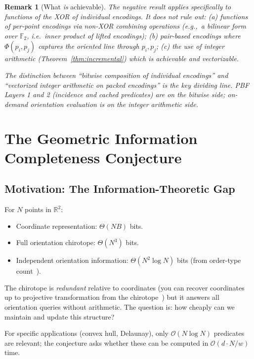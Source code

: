\documentclass[11pt,letterpaper]{article}
\newtheorem{remark}[theorem]{Remark}
\newcommand{\RR}{\mathbb{R}}
\newcommand{\cO}{\mathcal{O}}
\newcommand{\wt}{w}       %
\begin{document}
\begin{remark}[What \emph{is} achievable]
The negative result applies specifically to functions of the XOR of individual
encodings.  It does \emph{not} rule out:
(a) functions of per-point encodings via non-XOR combining operations (e.g.,\ a
bilinear form over $\mathbb{F}_2$, i.e.\ inner product of lifted encodings);
(b) pair-based encodings where $\Phi(p_i,p_j)$ captures the oriented line through $p_i,p_j$;
(c) the use of integer arithmetic (Theorem~\ref{thm:incremental}) which \emph{is}
achievable and vectorizable.

The distinction between ``bitwise composition of individual encodings'' and
``vectorized integer arithmetic on packed encodings'' is the key dividing line.
PBF Layers 1 and 2 (incidence and cached predicates) are on the bitwise side;
on-demand orientation evaluation is on the integer arithmetic side.
\end{remark}

\section{The Geometric Information Completeness Conjecture}\label{sec:conjecture}

\subsection{Motivation: The Information-Theoretic Gap}

For $N$ points in $\RR^2$:
\begin{itemize}[nosep]
\item Coordinate representation: $\Theta(NB)$ bits.
\item Full orientation chirotope: $\Theta(N^3)$ bits.
\item Independent orientation information: $\Theta(N^2\log N)$ bits (from order-type
  count~\cite{Aichholzer07}).
\end{itemize}

The chirotope is \emph{redundant} relative to coordinates (you can recover coordinates
up to projective transformation from the chirotope~\cite{Mnev88}) but it answers
all orientation queries without arithmetic.  The question is: how cheaply can we
maintain and update this structure?

For specific applications (convex hull, Delaunay), only $\cO(N\log N)$ predicates are
relevant; the conjecture asks whether these can be computed in $\cO(d\cdot N/\wt)$
time.
\end{document}
